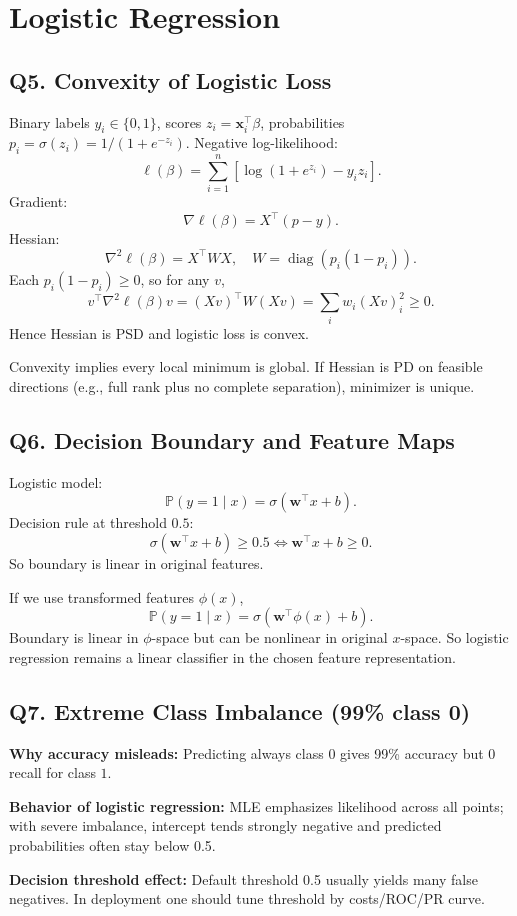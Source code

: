 \documentclass[11pt]{article}
\newcommand{\Pp}{\mathbb{P}}
\newcommand{\1}{\mathbf{1}}
\newcommand{\xx}{\mathbf{x}}
\newcommand{\ww}{\mathbf{w}}
\begin{document}
\section{Logistic Regression}

\subsection*{Q5. Convexity of Logistic Loss}
Binary labels $y_i\in\{0,1\}$, scores $z_i=\xx_i^\top\beta$, probabilities $p_i=\sigma(z_i)=1/(1+e^{-z_i})$.
Negative log-likelihood:
\[
\ell(\beta)=\sum_{i=1}^n\left[\log(1+e^{z_i})-y_i z_i\right].
\]
Gradient:
\[
\nabla \ell(\beta)=X^\top(p-y).
\]
Hessian:
\[
\nabla^2\ell(\beta)=X^\top W X,
\quad W=\operatorname{diag}(p_i(1-p_i)).
\]
Each $p_i(1-p_i)\ge0$, so for any $v$,
\[
v^\top\nabla^2\ell(\beta)v=(Xv)^\top W(Xv)=\sum_i w_i(Xv)_i^2\ge0.
\]
Hence Hessian is PSD and logistic loss is convex.

Convexity implies every local minimum is global. If Hessian is PD on feasible directions (e.g., full rank plus no complete separation), minimizer is unique.

\subsection*{Q6. Decision Boundary and Feature Maps}
Logistic model:
\[
\Pp(y=1\mid x)=\sigma(\ww^\top x+b).
\]
Decision rule at threshold $0.5$:
\[
\sigma(\ww^\top x+b)\ge0.5\iff \ww^\top x+b\ge0.
\]
So boundary is linear in original features.

If we use transformed features $\phi(x)$,
\[
\Pp(y=1\mid x)=\sigma(\ww^\top\phi(x)+b).
\]
Boundary is linear in $\phi$-space but can be nonlinear in original $x$-space. So logistic regression remains a linear classifier in the chosen feature representation.

\subsection*{Q7. Extreme Class Imbalance (99\% class 0)}
\textbf{Why accuracy misleads:}
Predicting always class $0$ gives 99\% accuracy but 0 recall for class $1$.

\textbf{Behavior of logistic regression:}
MLE emphasizes likelihood across all points; with severe imbalance, intercept tends strongly negative and predicted probabilities often stay below 0.5.

\textbf{Decision threshold effect:}
Default threshold 0.5 usually yields many false negatives. In deployment one should tune threshold by costs/ROC/PR curve.
\end{document}
